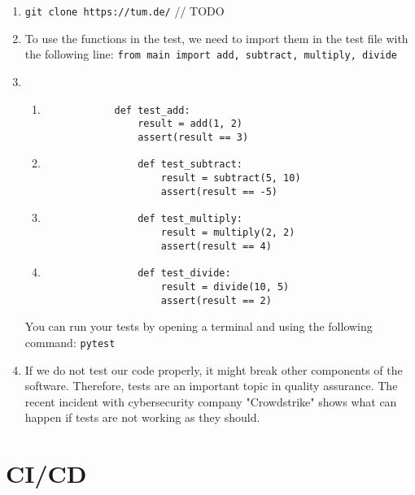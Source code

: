 \documentclass[english]{sheet}
\begin{document}
\begin{solution}
    \begin{enumerate}
        \item \texttt{git clone https://tum.de/} // TODO
	\item To use the functions in the test, we need to import them in the test file with the following line: \texttt{from main import add, subtract, multiply, divide}
        \item 
            \begin{enumerate}
                \item \begin{verbatim} 
			def test_add:
				result = add(1, 2)
				assert(result == 3)
		\end{verbatim}
		\item \begin{verbatim} 
				def test_subtract:
					result = subtract(5, 10)
					assert(result == -5)
			\end{verbatim}
		\item \begin{verbatim} 
				def test_multiply:
					result = multiply(2, 2)
					assert(result == 4)
			\end{verbatim}
		\item \begin{verbatim} 
				def test_divide:
					result = divide(10, 5)
					assert(result == 2)
			\end{verbatim}
            \end{enumerate}
            You can run your tests by opening a terminal and using the following command: \texttt{pytest}
	\item If we do not test our code properly, it might break other components of the software. Therefore, tests are an important topic in quality assurance. The recent incident with cybersecurity company "Crowdstrike" shows what can happen if tests are not working as they should.
    \end{enumerate}
\end{solution}


\section{CI/CD}
\end{document}
